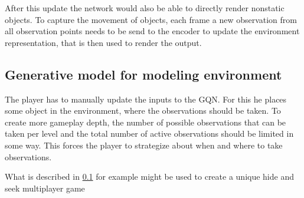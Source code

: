 After this update the network would also be able to directly render nonstatic objects. To capture the movement of objects, each frame a new observation from all observation points needs to be send to the encoder to update the environment representation, that is then used to render the output.


\subsection{Generative model for modeling environment}\label{PlayerEnvironmentModeling}
The player has to manually update the inputs to the GQN. For this he places some object in the environment, where the observations should be taken. To create more gameplay depth, the number of possible observations that can be taken per level and the total number of active observations should be limited in some way. This forces the player to strategize about when and where to take observations.

What is described in \cref{PlayerEnvironmentModeling} for example might be used to create a unique hide and seek multiplayer game
